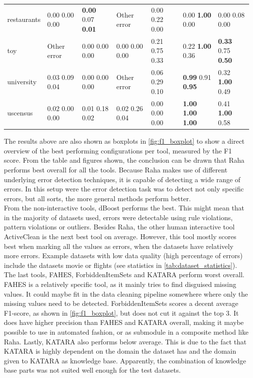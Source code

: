 \begin{table}[H]
\begin{adjustbox}{center}
\begin{tabular}{lllllll}
restaurants & 0.00 0.00 0.00 & \textbf{0.00} 0.07 \textbf{0.01} & Other error & 0.00 0.22 0.00 & 0.00 \textbf{1.00} 0.00 & 0.00 0.08 0.00 \\
toy & Other error & 0.00 0.00 0.00 & 0.00 0.00 0.00 & 0.21 0.75 0.33 & 0.22 \textbf{1.00} 0.36 & \textbf{0.33} 0.75 \textbf{0.50} \\
university & 0.03 0.09 0.04 & 0.00 0.00 0.00 & Other error & 0.06 0.29 0.10 & \textbf{0.99} 0.91 \textbf{0.95} & 0.32 \textbf{1.00} 0.49 \\
uscensus & 0.02 0.00 0.00 & 0.01 0.18 0.02 & 0.02 0.26 0.04 & 0.00 0.00 0.00 & \textbf{1.00} \textbf{1.00} \textbf{1.00} & 0.41 \textbf{1.00} 0.58 \\
\bottomrule
\end{tabular}
\end{adjustbox}
\end{table}

The results above are also shown as boxplots in \autoref{fig:f1_boxplot} to show a direct overview of the best performing configurations per tool, measured by the F1 score. From the table and figures shown, the conclusion can be drawn that Raha performs best overall for all the tools. Because Raha makes use of different underlying error detection techniques, it is capable of detecting a wide range of errors. In this setup were the error detection task was to detect not only specific errors, but all sorts, the more general methods perform better.
\\From the non-interactive tools, dBoost performs the best. This might mean that in the majority of datasets used, errors were detectable using rule violations, pattern violations or outliers. 
Besides Raha, the other human interactive tool ActiveClean is the next best tool on average. However, this tool mostly scores best when marking all the values as errors, when the datasets have relatively more errors. Example datasets with low data quality (high percentage of errors) include the datasets movie or flights (see statistics in \autoref{tab:dataset_statistics}). 
The last tools, FAHES, ForbiddenItemSets and KATARA perform worst overall. FAHES is a relatively specific tool, as it mainly tries to find disguised missing values. It could maybe fit in the data cleaning pipeline somewhere where only the missing values need to be detected. ForbiddenItemSets scores a decent average F1-score, as shown in \autoref{fig:f1_boxplot}, but does not cut it against the top 3. It does have higher precision than FAHES and KATARA overall, making it maybe possible to use in automated fashion, or as submodule in a composite method like Raha. Lastly, KATARA also performs below average. This is due to the fact that KATARA is highly dependent on the domain the dataset has and the domain given to KATARA as knowledge base. Apparently, the combination of knowledge base parts was not suited well enough for the test datasets.


